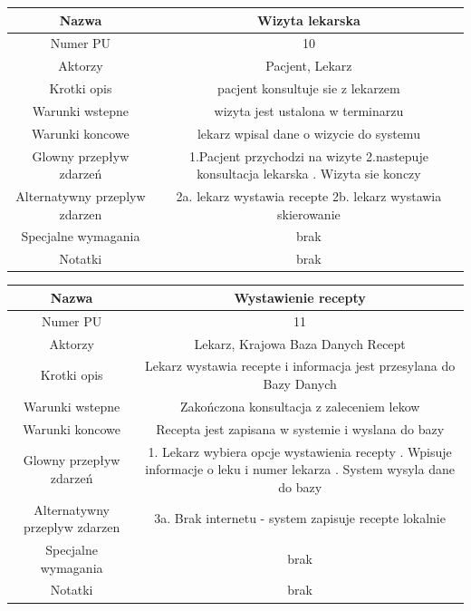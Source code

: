 \documentclass{article}
\begin{document}
\noindent
\begin{tabular}{|c|c|}%
        \hline
        Nazwa &Wizyta lekarska \\
        \hline
        Numer PU & 10\\
        \hline
        Aktorzy & Pacjent, Lekarz\\
        \hline
        Krotki opis & pacjent konsultuje sie z lekarzem\\
        \hline
        Warunki wstepne & wizyta jest ustalona w terminarzu\\
        \hline
        Warunki koncowe & lekarz wpisal dane o wizycie do systemu\\
        \hline
        Glowny przepływ zdarzeń& 1.Pacjent przychodzi na wizyte \newline
                                 2.nastepuje konsultacja lekarska \newline
                                 3. Wizyta sie konczy  \\
        \hline
        Alternatywny przeplyw zdarzen &  2a. lekarz wystawia recepte \newline
                                       2b. lekarz wystawia skierowanie\\
        \hline
        Specjalne wymagania & brak\\
        \hline
        Notatki& brak\\
        \hline
\end{tabular}

\vspace{1cm}

\noindent
\begin{tabular}{|c|c|}%
        \hline
        Nazwa & Wystawienie recepty \\
        \hline
        Numer PU & 11\\
        \hline
        Aktorzy & Lekarz, Krajowa Baza Danych Recept\\
        \hline
        Krotki opis & Lekarz wystawia recepte i informacja jest przesylana do Bazy Danych\\
        \hline
        Warunki wstepne & Zakończona konsultacja z zaleceniem lekow\\
        \hline
        Warunki koncowe & Recepta jest zapisana w systemie i wyslana do bazy\\
        \hline
        Glowny przepływ zdarzeń & 1. Lekarz wybiera opcje wystawienia recepty \newline
                                 2. Wpisuje informacje o leku i numer lekarza \newline
                                 3. System wysyla dane do bazy  \\
        \hline
        Alternatywny przeplyw zdarzen &  3a. Brak internetu - system zapisuje recepte lokalnie\\
        \hline
        Specjalne wymagania & brak\\
        \hline
        Notatki& brak\\
        \hline
\end{tabular}
\end{document}
